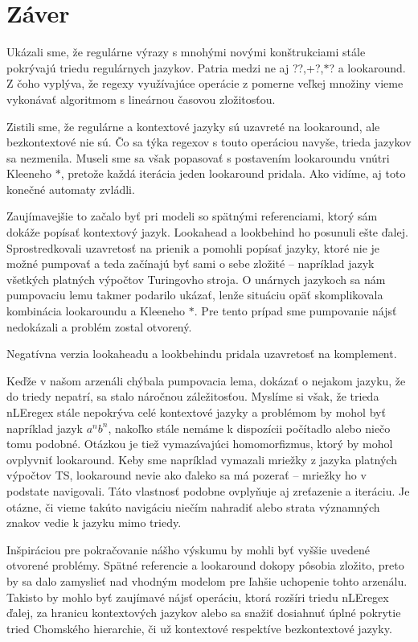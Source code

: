 \chapter*{Záver}\label{chap:conc}
{}

Ukázali sme, že regulárne výrazy s mnohými novými konštrukciami stále pokrývajú triedu regulárnych jazykov. Patria medzi ne aj {\ttfamily \selectfont ??,+?,$*$?} a lookaround. Z čoho vyplýva, že regexy využívajúce operácie z pomerne veľkej množiny vieme vykonávať algoritmom s lineárnou časovou zložitosťou.

Zistili sme, že regulárne a kontextové jazyky sú uzavreté na lookaround, ale bezkontextové nie sú. Čo sa týka regexov s touto operáciou navyše, trieda jazykov sa nezmenila. Museli sme sa však popasovať s postavením lookaroundu vnútri Kleeneho $*$, pretože každá iterácia jeden lookaround pridala. Ako vidíme, aj toto konečné automaty zvládli.

Zaujímavejšie to začalo byť pri modeli so spätnými referenciami, ktorý sám dokáže popísať kontextový jazyk. Lookahead a lookbehind ho posunuli ešte ďalej. Sprostredkovali uzavretosť na prienik a pomohli popísať jazyky, ktoré nie je možné pumpovať a teda začínajú byť sami o sebe zložité -- napríklad jazyk všetkých platných výpočtov Turingovho stroja. O unárnych jazykoch sa nám pumpovaciu lemu takmer podarilo ukázať, lenže situáciu opäť skomplikovala kombinácia lookaroundu a Kleeneho $*$. Pre tento prípad sme pumpovanie nájsť nedokázali a problém zostal otvorený.

Negatívna verzia lookaheadu a lookbehindu pridala uzavretosť na komplement.

Keďže v našom arzenáli chýbala pumpovacia lema, dokázať o nejakom jazyku, že do triedy nepatrí, sa stalo náročnou záležitosťou. Myslíme si však, že trieda nLEregex stále nepokrýva celé kontextové jazyky a problémom by mohol byť napríklad jazyk $a^nb^n$, nakoľko stále nemáme k dispozícii počítadlo alebo niečo tomu podobné. Otázkou je tiež vymazávajúci homomorfizmus, ktorý by mohol ovplyvniť lookaround. Keby sme napríklad vymazali mriežky z jazyka platných výpočtov TS, lookaround nevie ako ďaleko sa má pozerať -- mriežky ho v podstate navigovali. Táto vlastnosť podobne ovplyňuje aj zreťazenie a iteráciu. Je otázne, či vieme takúto navigáciu niečím nahradiť alebo strata významných znakov vedie k jazyku mimo triedy.

Inšpiráciou pre pokračovanie nášho výskumu by mohli byť vyššie uvedené otvorené problémy. Spätné referencie a lookaround dokopy pôsobia zložito, preto by sa dalo zamyslieť nad vhodným modelom pre ľahšie uchopenie tohto arzenálu. Takisto by mohlo byť zaujímavé nájsť operáciu, ktorá rozšíri triedu nLEregex ďalej, za hranicu kontextových jazykov alebo sa snažiť dosiahnuť úplné pokrytie tried Chomského hierarchie, či už kontextové respektíve bezkontextové jazyky.
